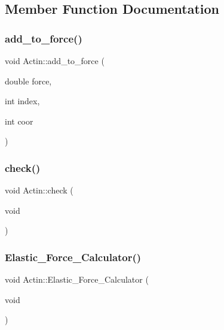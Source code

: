 \subsection{Member Function Documentation}
\mbox{\label{classActin_afb396a5e38dede5d41066f6f1c5893ed}} 
\subsubsection{\texorpdfstring{add\_to\_force()}{add\_to\_force()}}
{\footnotesize\ttfamily void Actin\+::add\+\_\+to\+\_\+force (\begin{DoxyParamCaption}\item[{double}]{force,  }\item[{int}]{index,  }\item[{int}]{coor }\end{DoxyParamCaption})\hspace{0.3cm}{\ttfamily [inline]}}

\mbox{\label{classActin_abb02feefaf5bfccbcee6cd1637f3c742}} 
\subsubsection{\texorpdfstring{check()}{check()}}
{\footnotesize\ttfamily void Actin\+::check (\begin{DoxyParamCaption}\item[{void}]{ }\end{DoxyParamCaption})}

\mbox{\label{classActin_a08970f92fbaf37cfce9e983ec2f5eefa}} 
\subsubsection{\texorpdfstring{Elastic\_Force\_Calculator()}{Elastic\_Force\_Calculator()}}
{\footnotesize\ttfamily void Actin\+::\+Elastic\+\_\+\+Force\+\_\+\+Calculator (\begin{DoxyParamCaption}\item[{void}]{ }\end{DoxyParamCaption})}

